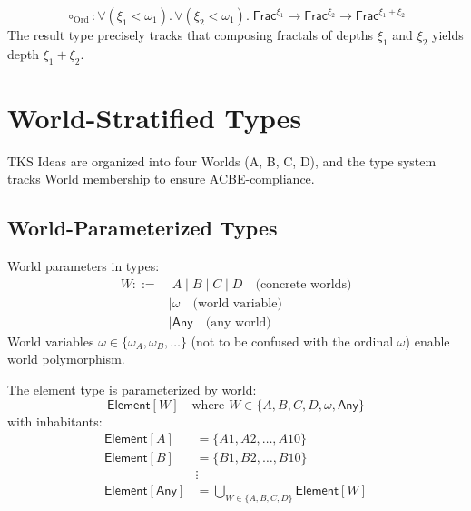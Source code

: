 \begin{example}
\label{ex:ordinal-poly-frac}
\[
\circ_{\mathrm{Ord}} : \forall (\xi_1 < \omega_1).\, \forall (\xi_2 < \omega_1).\;
  \mathsf{Frac}^{\xi_1} \to \mathsf{Frac}^{\xi_2} \to \mathsf{Frac}^{\xi_1 + \xi_2}
\]
The result type precisely tracks that composing fractals of depths $\xi_1$ and $\xi_2$ yields depth $\xi_1 + \xi_2$.
\end{example}

\section{World-Stratified Types}
\label{sec:world-stratified-types}

TKS Ideas are organized into four Worlds (A, B, C, D), and the type system tracks World membership to ensure ACBE-compliance.

\subsection{World-Parameterized Types}
\label{subsec:world-param}

\begin{definition}
\label{def:world-type-param}
World parameters in types:
\begin{align}
W ::=&\; A \mid B \mid C \mid D \quad \text{(concrete worlds)} \\
    &\mid \omega \quad \text{(world variable)} \\
    &\mid \mathsf{Any} \quad \text{(any world)}
\end{align}
World variables $\omega \in \{\omega_A, \omega_B, \ldots\}$ (not to be confused with the ordinal $\omega$) enable world polymorphism.
\end{definition}

\begin{definition}
\label{def:world-element}
The element type is parameterized by world:
\[
\mathsf{Element}[W] \quad \text{where } W \in \{A, B, C, D, \omega, \mathsf{Any}\}
\]
with inhabitants:
\begin{align}
\mathsf{Element}[A] &= \{A1, A2, \ldots, A10\} \\
\mathsf{Element}[B] &= \{B1, B2, \ldots, B10\} \\
&\vdots \\
\mathsf{Element}[\mathsf{Any}] &= \bigcup_{W \in \{A,B,C,D\}} \mathsf{Element}[W]
\end{align}
\end{definition}

